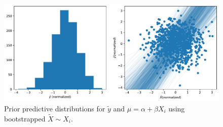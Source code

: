 \begin{figure}[H]
    \centering
    \includegraphics[width=0.8\linewidth]{data/05_reporting/problem_set_2/prior_predictive.pdf}
    \caption{Prior predictive distributions for $\tilde{y}$ and $\mu = \alpha + \beta X_i$ using bootstrapped $\tilde{X} \sim X_i$.}
    \label{fig:prior-predictive}
\end{figure}